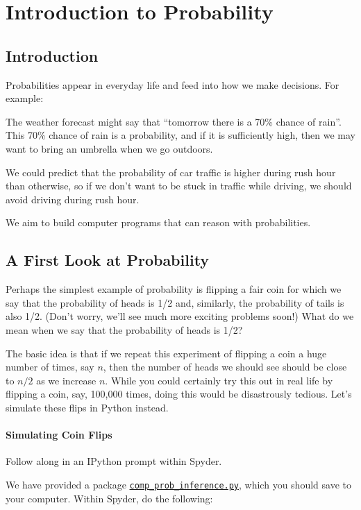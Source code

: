 \documentclass[6008notes.tex]{subfiles}
\begin{document}
\graphicspath{ {images/introprob/} }

\section{Introduction to Probability}

\subsection{Introduction}
Probabilities appear in everyday life and feed into how we make decisions. For example:

The weather forecast might say that ``tomorrow there is a 70\% chance of rain''. This 70\% chance of rain is a probability, and if it is sufficiently high, then we may want to bring an umbrella when we go outdoors.

We could predict that the probability of car traffic is higher during rush hour than otherwise, so if we don't want to be stuck in traffic while driving, we should avoid driving during rush hour.

We aim to build computer programs that can reason with probabilities.

\subsection{A First Look at Probability}
Perhaps the simplest example of probability is flipping a fair coin for which we say that the probability of heads is 1/2 and, similarly, the probability of tails is also 1/2. (Don't worry, we'll see much more exciting problems soon!) What do we mean when we say that the probability of heads is 1/2?

The basic idea is that if we repeat this experiment of flipping a coin a huge number of times, say $n$, then the number of heads we should see should be close to $n/2$ as we increase $n$. While you could certainly try this out in real life by flipping a coin, say, 100,000 times, doing this would be disastrously tedious. Let's simulate these flips in Python instead.

\paragraph{Simulating Coin Flips}

Follow along in an IPython prompt within Spyder.

We have provided a package \href{https://d37djvu3ytnwxt.cloudfront.net/assets/courseware/v1/710ba23b569da54c14fc614315ced6a1/asset-v1:MITx+6.008.1x+3T2016+type@asset+block/comp_prob_inference.py}{\texttt{comp\_prob\_inference.py}}, which you should save to your computer. Within Spyder, do the following:
\end{document}
